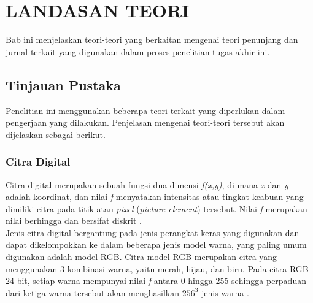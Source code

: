 \chapter{LANDASAN TEORI}
Bab ini menjelaskan teori-teori yang berkaitan mengenai teori penunjang dan jurnal terkait yang digunakan dalam proses penelitian tugas akhir ini. \\

%
\vspace{4.5pt}

\section{Tinjauan Pustaka}
\noindent Penelitian ini menggunakan beberapa teori terkait yang diperlukan dalam pengerjaan yang dilakukan. Penjelasan mengenai teori-teori tersebut akan dijelaskan sebagai berikut. \\

\subsection{Citra Digital}
\label{subsec:CitraDigital}
\noindent Citra digital merupakan sebuah fungsi dua dimensi \textit{f(x,y)}, di mana \textit{x} dan \textit{y} adalah koordinat, dan nilai \textit{f} menyatakan intensitas atau tingkat keabuan yang dimiliki citra pada titik atau \textit{pixel} (\textit{picture element}) tersebut. Nilai \textit{f} merupakan nilai berhingga dan bersifat diskrit \cite{gonzalez}.\\
\noindent Jenis citra digital bergantung pada jenis perangkat keras yang digunakan dan dapat dikelompokkan ke dalam beberapa jenis model warna, yang paling umum digunakan adalah model RGB. Citra model RGB merupakan citra yang menggunakan 3 kombinasi warna, yaitu merah, hijau, dan biru. Pada citra RGB 24-bit, setiap warna mempunyai nilai \textit{f} antara 0 hingga 255 sehingga perpaduan dari ketiga warna tersebut akan menghasilkan $256^{3}$ jenis warna \cite{gonzalez}. \\

